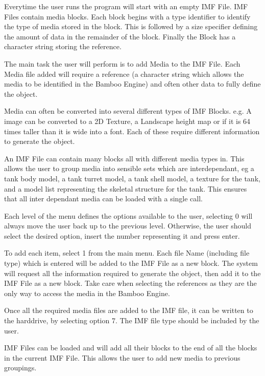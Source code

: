 Everytime the user runs the program will start with an empty IMF File. IMF Files contain media blocks. Each block begins with a type identifier to identify the type of media stored in the block. This is followed by a size specifier defining the amount of data in the remainder of the block. Finally the Block has a character string storing the reference.\par
 The main task the user will perform is to add Media to the IMF File. Each Media file added will require a reference (a character string which allows the media to be identified in the Bamboo Engine) and often other data to fully define the object.\par
 Media can often be converted into several different types of IMF Blocks. e.g. A image can be converted to a 2D Texture, a Landscape height map or if it is 64 times taller than it is wide into a font. Each of these require different information to generate the object.\par
 An IMF File can contain many blocks all with different media types in. This allows the user to group media into sensible sets which are interdependant, eg a tank body model, a tank turret model, a tank shell model, a texture for the tank, and a model list representing the skeletal structure for the tank. This ensures that all inter dependant media can be loaded with a single call.\par
 Each level of the menu defines the options available to the user, selecting 0 will always move the user back up to the previous level. Otherwise, the user should select the desired option, insert the number representing it and press enter.\par


To add each item, select 1 from the main menu. Each file Name (including file type) which is entered will be added to the IMF File as a new block. The system will request all the information required to generate the object, then add it to the IMF File as a new block. Take care when selecting the references as they are the only way to access the media in the Bamboo Engine.\par
 Once all the required media files are added to the IMF file, it can be written to the harddrive, by selecting option 7. The IMF file type should be included by the user.\par
 IMF Files can be loaded and will add all their blocks to the end of all the blocks in the current IMF File. This allows the user to add new media to previous groupings.\par


